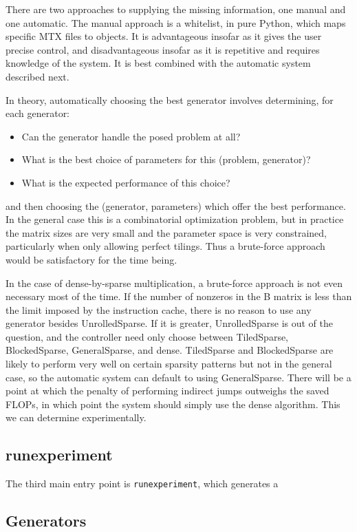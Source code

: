 There are two approaches to supplying the missing information, one manual and one automatic. The manual approach is a whitelist, in pure Python, which maps specific MTX files to  objects. It is advantageous insofar as it gives the user precise control, and disadvantageous insofar as it is repetitive and requires knowledge of the system. It is best combined with the automatic system described next.

In theory, automatically choosing the best generator involves determining, for each generator:
\begin{itemize}
  \item{Can the generator handle the posed problem at all?}
  \item{What is the best choice of parameters for this (problem, generator)?}
  \item{What is the expected performance of this choice?}
\end{itemize}
and then choosing the (generator, parameters) which offer the best performance. In the general case this is a combinatorial optimization problem, but in practice the matrix sizes are very small and the parameter space is very constrained, particularly when only allowing perfect tilings. Thus a brute-force approach would be satisfactory for the time being. 

In the case of dense-by-sparse multiplication, a brute-force approach is not even necessary most of the time. If the number of nonzeros in the B matrix is less than the limit imposed by the instruction cache, there is no reason to use any generator besides UnrolledSparse. If it is greater, UnrolledSparse is out of the question, and the controller need only choose between TiledSparse, BlockedSparse, GeneralSparse, and dense. TiledSparse and BlockedSparse are likely to perform very well on certain sparsity patterns but not in the general case, so the automatic system can default to using GeneralSparse. There will be a point at which the penalty of performing indirect jumps outweighs the saved FLOPs, in which point the system should simply use the dense algorithm. This we can determine experimentally.


\subsection{runexperiment}
The third main entry point is \texttt{runexperiment}, which generates a 

\subsection{Generators}

